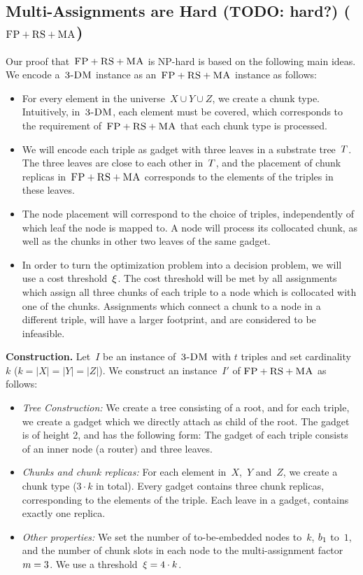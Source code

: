 \subsection{Multi-Assignments are Hard (TODO: hard?) ($\textsc{FP}+\textsc{RS}+\textsc{MA}$)}\label{ssec:fprsma}

Our proof that~$\textsc{FP}+\textsc{RS}+\textsc{MA}$ is NP-hard is based on the following main ideas.
We encode a~$\textsc{3-DM}$ instance as an~$\textsc{FP}+\textsc{RS}+\textsc{MA}$ instance as follows:

 \begin{itemize}
 \item For every element in the universe~$X\cup Y\cup
 Z$, we create a chunk type. Intuitively, in~$\textsc{3-DM}$,
 each element must be covered, which corresponds to the requirement
 of~$\textsc{FP}+\textsc{RS}+\textsc{MA}$
 that each chunk type is processed.

 \item We will encode each triple as gadget with three leaves in
 a substrate tree~$T$. The three leaves are close to each
 other in~$T$, and the placement of chunk replicas in~$\textsc{FP}+\textsc{RS}+\textsc{MA}$
 corresponds to the elements of the
 triples in these leaves.

 \item The node placement will correspond to the choice of triples,
 independently of which
leaf the node is mapped to.
 A node will process its collocated chunk,
 as well as the chunks in other two leaves of the same gadget.

\item In order to turn the optimization problem into a decision problem, we will use
a cost threshold~$\xi$. The cost threshold will be met by all
assignments which assign all three chunks of each triple to a
node which is collocated with one of the chunks. Assignments which connect a
chunk to a node in a different triple, will have a larger footprint, and are
considered to be infeasible.

\end{itemize}


\textbf{Construction.}
Let~$I$ be an instance of~$\textsc{3-DM}$ with $t$ triples and set cardinality $k$ ($k = |X| = |Y| = |Z|$).
We construct an instance~$I'$ of
$\textsc{FP}+\textsc{RS}+\textsc{MA}$ as follows:
\begin{itemize}
\item \emph{Tree Construction:} We create a tree consisting of a root,
and for each triple, we create a gadget which we directly attach as
child of the root. The gadget is of height 2,
and has the following form:
The gadget of each triple consists of an inner node (a router) and three leaves.
\item \emph{Chunks and chunk replicas:} For each element in~$X$,~$Y$ and~$Z$,
 we create a chunk type
($3 \cdot k$ in total). Every gadget contains three chunk replicas,
corresponding to the elements of the triple. Each leave in a gadget, contains
exactly one replica.
\item \emph{Other properties:} We set the number of to-be-embedded nodes to~$k$,
$b_1$ to~$1$, and the number of chunk slots in each node to the multi-assignment factor
$m=3$.
We use a threshold~$\xi= 4
\cdot k$.
\end{itemize}

